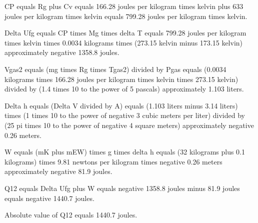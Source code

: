 CP equals Rg plus Cv equals 166.28 joules per kilogram times kelvin plus 633 joules per kilogram times kelvin equals 799.28 joules per kilogram times kelvin.

Delta Ufg equals CP times Mg times delta T equals 799.28 joules per kilogram times kelvin times 0.0034 kilograms times (273.15 kelvin minus 173.15 kelvin) approximately negative 1358.8 joules.

Vgas2 equals (mg times Rg times Tgas2) divided by Pgas equals (0.0034 kilograms times 166.28 joules per kilogram times kelvin times 273.15 kelvin) divided by (1.4 times 10 to the power of 5 pascals) approximately 1.103 liters.

Delta h equals (Delta V divided by A) equals (1.103 liters minus 3.14 liters) times (1 times 10 to the power of negative 3 cubic meters per liter) divided by (25 pi times 10 to the power of negative 4 square meters) approximately negative 0.26 meters.

W equals (mK plus mEW) times g times delta h equals (32 kilograms plus 0.1 kilograms) times 9.81 newtons per kilogram times negative 0.26 meters approximately negative 81.9 joules.

Q12 equals Delta Ufg plus W equals negative 1358.8 joules minus 81.9 joules equals negative 1440.7 joules.

Absolute value of Q12 equals 1440.7 joules.